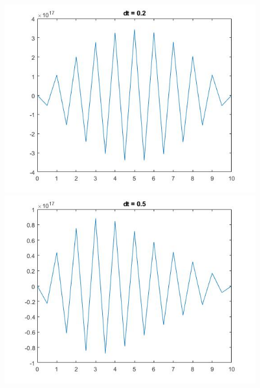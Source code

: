 \begin{figure}
\begin{minipage}{0.5\textwidth}
\includegraphics[width = \textwidth]{4.jpg}
\end{minipage}
\begin{minipage}{0.5\textwidth}
\includegraphics[width = \textwidth]{5.jpg}
\end{minipage}
\end{figure}

